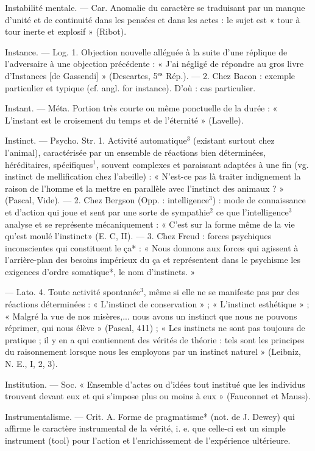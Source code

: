 Instabilité mentale. — Car. Anomalie
du caractère se traduisant par un
manque d'unité et de continuité
dans les pensées et dans les actes : le
sujet est « tour à tour inerte et
explosif » (Ribot).

Instance. — Log. 1. Objection nouvelle alléguée à la suite d’une réplique de l’adversaire à une objection précédente : « J’ai négligé de
répondre au gros livre d’Instances
[de Gassendi] » (Descartes, 5$^\text{es}$ Rép.).
— 2. Chez Bacon : exemple particulier et typique (cf. angl. for instance). D'où : cas particulier.

Instant. — Méta. Portion très courte
ou même ponctuelle de la durée :
« L'instant est le croisement du
temps et de l'éternité » (Lavelle).

Instinct. — Psycho. Str. 1. Activité
automatique$^3$ (existant surtout chez
l'animal), caractérisée par un ensemble de réactions bien déterminées, héréditaires, spécifiques$^1$,
souvent complexes et paraissant
adaptées à une fin (vg. instinct de
mellification chez l’abeille) : « N’est-ce pas là traiter indignement la
raison de l’homme et la mettre en
parallèle avec l'instinct des animaux ? » (Pascal, Vide). — 2. Chez
Bergson (Opp. : intelligence$^3$) : mode
de connaissance et d’action qui
joue et sent par une sorte de sympathie$^2$ ce que l'intelligence$^3$ analyse
et se représente mécaniquement :
« C’est sur la forme même de la vie
qu'est moulé l'instinct» (E. C, II). —
3. Chez Freud : forces psychiques
inconscientes qui constituent le ça* :
« Nous donnons aux forces qui agissent à l'arrière-plan des besoins
impérieux du ça et représentent
dans le psychisme les exigences d’ordre somatique*, le nom d’instincts. »

— Lato. 4. Toute activité spontanée$^3$, même si elle ne se manifeste
pas par des réactions déterminées :
« L'instinct de conservation » ;
« L'instinct esthétique » ; « Malgré la
vue de nos misères,... nous avons
un instinct que nous ne pouvons
réprimer, qui nous élève » (Pascal,
411) ; « Les instincts ne sont pas
toujours de pratique ; il y en a qui
contiennent des vérités de théorie :
tels sont les principes du raisonnement lorsque nous les employons
par un instinct naturel » (Leibniz,
N. E., I, 2, 3).

Institution. — Soc. « Ensemble d’actes
ou d'idées tout institué que les
individus trouvent devant eux et
qui s’impose plus ou moins à eux »
(Fauconnet et Mauss).

Instrumentalisme. — Crit. A. Forme
de pragmatisme* (not. de J. Dewey)
qui affirme le caractère instrumental
de la vérité, i. e. que celle-ci est un
simple instrument (tool) pour l’action
et l'enrichissement de l'expérience
ultérieure.

